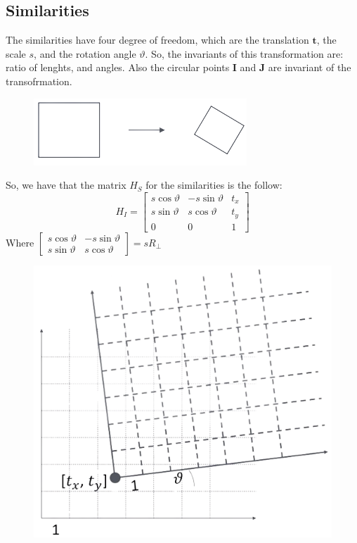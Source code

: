 \documentclass[12pt, a4paper]{report}
\newtheorem[style=M,bodystyle=\normalfont]{theorem}{Theorem}
\newtheorem[style=M,bodystyle=\normalfont]{corollary}{Corollary}
\newtheorem[style=M,bodystyle=\normalfont]{lemma}{Lemma}
\newtheorem[style=M,bodystyle=\normalfont]{definition}{Definition}
\begin{document}
    \subsection{Similarities}
    The similarities have four degree of freedom, which are the translation $\textbf{t}$, the scale $s$, and the rotation angle $\vartheta$. So, the invariants of this transformation are: ratio of lenghts, and angles.
    Also the circular points $\textbf{I}$ and $\textbf{J}$ are invariant of the transofrmation. 
    \begin{figure}[H]
        \centering
        \includegraphics[width=0.5\linewidth]{images/similarity.png}
    \end{figure}
    So, we have that the matrix $H_S$ for the similarities is the follow: 
    \[H_I=
    \begin{bmatrix}
        s\cos \vartheta & -s\sin \vartheta & t_x \\
        s\sin \vartheta & s\cos \vartheta & t_y \\
        0 & 0 & 1
    \end{bmatrix}\]
    Where $
    \begin{bmatrix}
        s\cos \vartheta & -s\sin \vartheta \\
        s\sin \vartheta & s\cos \vartheta
    \end{bmatrix}
    =sR_{\perp}$
    \begin{figure}[H]
        \centering
        \includegraphics[width=0.5\linewidth]{images/isometry1.png}
    \end{figure}
\end{document}
